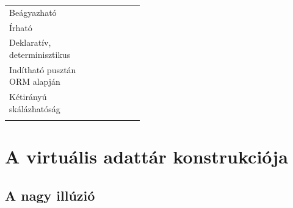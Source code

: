 \documentclass[
    parspace,
    noindent,
    nohyp,
]{elteiktdk}[2023/04/10]
\newcommand{\rhpad}{\vspace{0.6\baselineskip}}
\begin{document}
\begin{table}[H]
\begin{center}
\begin{tabular}{ |p{3.2cm}|c c c c c:c c| }
  \parbox{\comptableleftwidth}{\rhpad Beágyazható \rhpad} &
     &
     &
     &
     &
     &
     &
     \\
  \comptablelinesep
  \parbox{\comptableleftwidth}{\rhpad Írható \rhpad} &
     &
     &
     &
     &
     &
     &
     \\
  \comptablelinesep
  \parbox{\comptableleftwidth}{\rhpad Deklaratív, \\ determinisztikus \rhpad} &
     &
     &
     &
     &
     &
     &
     \\
  \comptablelinesep
  \parbox{\comptableleftwidth}{\rhpad Indítható pusztán \\ ORM alapján \rhpad} &
     &
     &
     &
     &
     &
     &
     \\
  \comptablelinesep
  \parbox{\comptableleftwidth}{\rhpad Kétirányú \\ skálázhatóság \rhpad} &
     &
     &
     &
     &
     &
     &
     \\
  \hline
\end{tabular}
\end{center}
\end{table}


\chapter{A virtuális adattár konstrukciója}

\section{A nagy illúzió}
\end{document}
